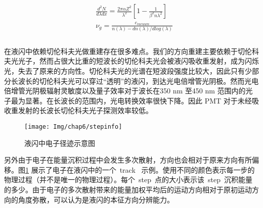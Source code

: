 \begin{equation}\label{eq:speed}
\begin{split}
&\frac{d^2N}{d\lambda dx}=\frac{2\pi\alpha Z^2}{\lambda^{2}}\left[1-\frac{1}{\beta^{2}n\lambda^{2}}\right]   \\
&\nu_g=\frac{c_{vacuum}}{n(\lambda)-dn(\lambda)/dlog(\lambda)}  \\
\end{split}
\end{equation}
\\
在液闪中依赖切伦科夫光做重建存在很多难点。我们的方向重建主要依赖于切伦科夫光光子，然而占很大比重的短波长的切伦科夫光会被液闪吸收重发射，成为闪烁光，失去了原来的方向性。切伦科夫光的光谱在短波段强度比较大，因此只有少部分长波长的切伦科夫光可以穿过``透明''的液闪，到达光电倍增管光阴极。然而光电倍增管光阴极辐射灵敏度以及量子效率对于波长在350 nm 至450 nm 范围内的光子最为显著。在长波长的范围内，光电转换效率很快下降。因此 PMT 对于未经吸收重发射的长波长切伦科夫光子探测效率较低。
  \begin{figure}[!htbp]
  \centering
   \texttt{[image: Img/chap6/stepinfo]}
    \caption{液闪中电子径迹示意图}
  \label{fig:stepinfo}
\end{figure}
另外由于电子在能量沉积过程中会发生多次散射，方向也会相对于原来方向有所偏移。图\ref{fig:stepinfo} 展示了电子在液闪中的一个~track~ 示例。使用不同的颜色表示每一步的物理过程（并不是唯一的物理过程）。每个~step~点的大小表示该~step~沉积能量的多少。由于电子的多次散射带来的能量加权平均后的运动方向相对于原初运动方向的角度弥散，可以认为是液闪的本征方向分辨能力。%


